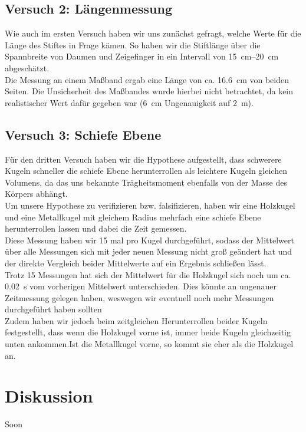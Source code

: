 \documentclass[11pt,a4paper,titlepage, ngerman]{article}
\begin{document}
	\subsection{Versuch 2: Längenmessung}
		
		Wie auch im ersten Versuch haben wir uns zunächst gefragt, welche Werte für die Länge des Stiftes in Frage kämen. So haben wir die Stiftlänge über die Spannbreite von Daumen und Zeigefinger in ein Intervall von \SIrange{15}{20}{\cm} abgeschätzt. \\ %
		Die Messung an einem Maßband ergab eine Länge von ca. \SI{16,6}{\cm} von beiden Seiten. Die Unsicherheit des Maßbandes wurde hierbei nicht betrachtet, da kein realistischer Wert dafür gegeben war (\SI{6}{\cm} Ungenauigkeit auf \SI{2}{\m}). %
		
	\subsection{Versuch 3: Schiefe Ebene}
		
		Für den dritten Versuch haben wir die Hypothese aufgestellt, dass schwerere Kugeln schneller die schiefe Ebene herunterrollen als leichtere Kugeln gleichen Volumens, da das uns bekannte Trägheitsmoment ebenfalls von der Masse des Körpers abhängt. \\
		Um unsere Hypothese zu verifizieren bzw. falsifizieren, haben wir eine Holzkugel und eine Metallkugel mit gleichem Radius mehrfach eine schiefe Ebene herunterrollen lassen und dabei die Zeit gemessen. \\
		Diese Messung haben wir 15 mal pro Kugel durchgeführt, sodass der Mittelwert über alle Messungen sich mit jeder neuen Messung nicht groß geändert hat und der direkte Vergleich beider Mittelwerte auf ein Ergebnis schließen lässt. \\ %
		Trotz 15 Messungen hat sich der Mittelwert für die Holzkugel sich noch um ca. \SI{0.02}{s} vom vorherigen Mittelwert unterschieden. Dies könnte an ungenauer Zeitmessung gelegen haben, weswegen wir eventuell noch mehr Messungen durchgeführt haben sollten \\
		Zudem haben wir jedoch beim zeitgleichen Herunterrollen beider Kugeln festgestellt, dass wenn die Holzkugel vorne ist, immer beide Kugeln gleichzeitig unten ankommen.Ist die Metallkugel vorne, so kommt sie eher als die Holzkugel an.
		

\section{Diskussion}
	
	Soon\texttrademark

\begin{thebibliography}{}

\end{thebibliography}
\end{document}
